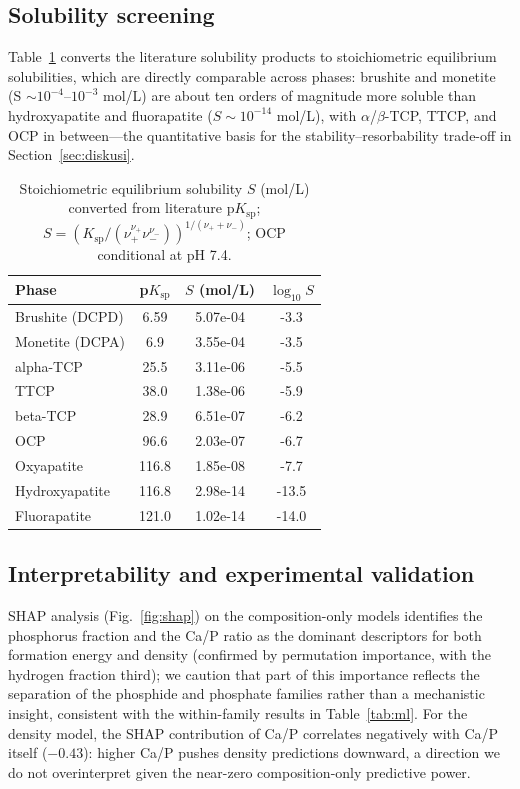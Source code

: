 \documentclass[11pt,a4paper]{article}
\begin{document}
\subsection{Solubility screening}\label{sec:kelarutan}
Table~\ref{tab:kelarutan} converts the literature solubility products to stoichiometric equilibrium solubilities, which are directly comparable across phases: brushite and monetite (S $\sim 10^{-4}$--$10^{-3}$ mol/L) are about ten orders of magnitude more soluble than hydroxyapatite and fluorapatite ($S \sim 10^{-14}$ mol/L), with $\alpha$/$\beta$-TCP, TTCP, and OCP in between---the quantitative basis for the stability--resorbability trade-off in Section~\ref{sec:diskusi}.

\begin{table}[ht]
\centering\small
\caption{Stoichiometric equilibrium solubility $S$ (mol/L) converted from literature p$K_\mathrm{sp}$; $S = (K_\mathrm{sp}/(\nu_+^{\nu_+}\nu_-^{\nu_-}))^{1/(\nu_++\nu_-)}$; OCP conditional at pH 7.4.}
\label{tab:kelarutan}
\begin{tabular}{lccc}
\toprule
Phase & p$K_\mathrm{sp}$ & $S$ (mol/L) & $\log_{10}S$ \\
\midrule
Brushite (DCPD) & 6.59 & 5.07e-04 & -3.3 \\
Monetite (DCPA) & 6.9 & 3.55e-04 & -3.5 \\
alpha-TCP & 25.5 & 3.11e-06 & -5.5 \\
TTCP & 38.0 & 1.38e-06 & -5.9 \\
beta-TCP & 28.9 & 6.51e-07 & -6.2 \\
OCP & 96.6 & 2.03e-07 & -6.7 \\
Oxyapatite & 116.8 & 1.85e-08 & -7.7 \\
Hydroxyapatite & 116.8 & 2.98e-14 & -13.5 \\
Fluorapatite & 121.0 & 1.02e-14 & -14.0 \\
\bottomrule
\end{tabular}
\end{table}


\subsection{Interpretability and experimental validation}\label{sec:validasi}
SHAP analysis (Fig.~\ref{fig:shap}) on the composition-only models identifies the phosphorus fraction and the Ca/P ratio as the dominant descriptors for both formation energy and density (confirmed by permutation importance, with the hydrogen fraction third); we caution that part of this importance reflects the separation of the phosphide and phosphate families rather than a mechanistic insight, consistent with the within-family results in Table~\ref{tab:ml}. For the density model, the SHAP contribution of Ca/P correlates negatively with Ca/P itself ($-0.43$): higher Ca/P pushes density predictions downward, a direction we do not overinterpret given the near-zero composition-only predictive power.
\end{document}
